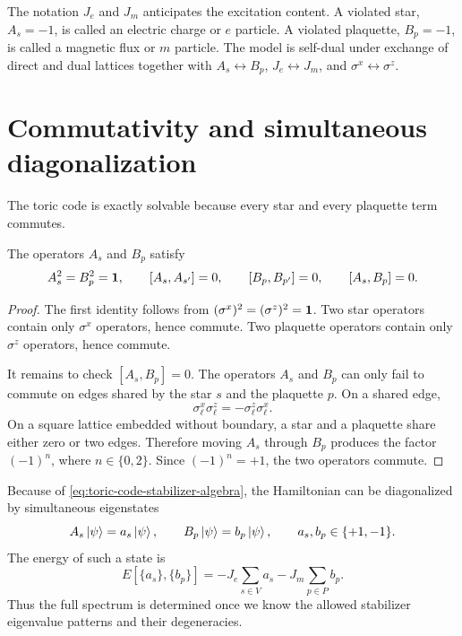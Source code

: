 \begin{remark}
The notation \(J_e\) and \(J_m\) anticipates the excitation content.  A violated
star, \(A_s=-1\), is called an electric charge or \(e\) particle.  A violated
plaquette, \(B_p=-1\), is called a magnetic flux or \(m\) particle.  The model
is self-dual under exchange of direct and dual lattices together with
\(A_s\leftrightarrow B_p\), \(J_e\leftrightarrow J_m\), and
\(\sigma^x\leftrightarrow\sigma^z\).
\end{remark}

\section{Commutativity and simultaneous diagonalization}
\label{sec:toric-code-commutativity}

The toric code is exactly solvable because every star and every plaquette term
commutes.

\begin{proposition}
The operators \(A_s\) and \(B_p\) satisfy
\begin{equation}
\label{eq:toric-code-stabilizer-algebra}
    A_s^2=B_p^2=\mathbf{1},
    \qquad
    [A_s,A_{s'}]=0,
    \qquad
    [B_p,B_{p'}]=0,
    \qquad
    [A_s,B_p]=0 .
\end{equation}
\end{proposition}

\begin{proof}
The first identity follows from \((\sigma^x)^2=(\sigma^z)^2=\mathbf{1}\).  Two star
operators contain only \(\sigma^x\) operators, hence commute.  Two plaquette
operators contain only \(\sigma^z\) operators, hence commute.

It remains to check \([A_s,B_p]=0\).  The operators \(A_s\) and \(B_p\) can only
fail to commute on edges shared by the star \(s\) and the plaquette \(p\).  On a
shared edge,
\begin{equation}
\label{eq:pauli-anticommute-local}
    \sigma^x_{\ell}\sigma^z_{\ell}
    =
    -\sigma^z_{\ell}\sigma^x_{\ell} .
\end{equation}
On a square lattice embedded without boundary, a star and a plaquette share
either zero or two edges.  Therefore moving \(A_s\) through \(B_p\) produces the
factor \((-1)^n\), where \(n\in\{0,2\}\).  Since \((-1)^n=+1\), the two
operators commute.
\end{proof}

Because of \cref{eq:toric-code-stabilizer-algebra}, the Hamiltonian can be
diagonalized by simultaneous eigenstates
\begin{equation}
\label{eq:toric-code-simultaneous-eigenvalues}
    A_s\left|\psi\right\rangle=a_s\left|\psi\right\rangle,
    \qquad
    B_p\left|\psi\right\rangle=b_p\left|\psi\right\rangle,
    \qquad
    a_s,b_p\in\{+1,-1\} .
\end{equation}
The energy of such a state is
\begin{equation}
\label{eq:toric-code-energy-eigenvalue}
    E[\{a_s\},\{b_p\}]
    =
    -J_e\sum_{s\in V}a_s
    -J_m\sum_{p\in P}b_p .
\end{equation}
Thus the full spectrum is determined once we know the allowed stabilizer
eigenvalue patterns and their degeneracies.

